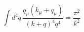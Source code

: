 \begin{equation}
\int d^4q\,\frac{q_\mu (k_\mu+q_\mu)}{(k+q)^4 q^4} = \frac{\pi^2}{k^2}
\end{equation}

